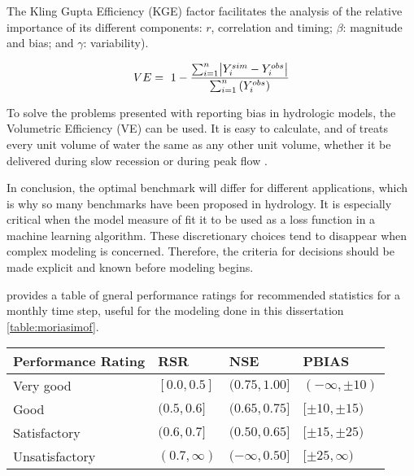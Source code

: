 The Kling Gupta Efficiency (KGE) factor facilitates the analysis of the relative importance of its different components: $r$, correlation and timing; $\beta$: magnitude and bias; and $\gamma$: variability).

\begin{equation} 
	\label{eq:ve}
	VE =\ 1-\dfrac{\sum^n_{i=1}{\abs{Y^{sim}_i-Y^{obs}_i}}}{\sum^n_{i=1}{(Y^{obs}_i)}} \\
\end{equation}

To solve the problems presented with reporting bias in hydrologic models, the Volumetric Efficiency (VE) can be used. It is easy to calculate, and of treats every unit volume of water the same as any other unit volume, whether it be delivered during slow recession or during peak flow \cite{criss2008nash}.

In conclusion, the optimal benchmark will differ for different applications, which is why so many benchmarks have been proposed in hydrology. It is especially critical when the model measure of fit it to be used as a loss function in a machine learning algorithm. These discretionary choices tend to disappear when complex modeling is concerned. Therefore, the criteria for decisions should be made explicit and known before modeling begins. 

 provides a table of gneral performance ratings for recommended statistics for a monthly time step, useful for the modeling done in this dissertation \ref{table:moriasimof}. 


\begin{table*}[h]\renewcommand{\arraystretch}{1.2} 
	\linespread{1.0}
	\centering
	\caption{General performance ratings for recommended statistics for a monthly time step. Reprinted from  \protect{}.}
	\begin{tabular}{p{7cm}p{2.5cm}p{2.5cm}p{2.5cm}} %
		Performance Rating & RSR & NSE & PBIAS \\
		\hline
		Very good & $[0.0 , 0.5]$ & $(0.75 , 1.00]$ & $(-\infty , \pm10)$\\
		Good & $(0.5 , 0.6]$ & $(0.65 , 0.75]$ & $[\pm10 , \pm15)$\\
		Satisfactory & $(0.6 , 0.7]$ & $(0.50 , 0.65]$ & $[\pm15 , \pm25)$\\
		Unsatisfactory & $(0.7 , \infty)$ & $(-\infty , 0.50]$ & $[\pm25 , \infty)$ \\
		\hline
	\end{tabular}
	\label{table:moriasimof}
\end{table*}


